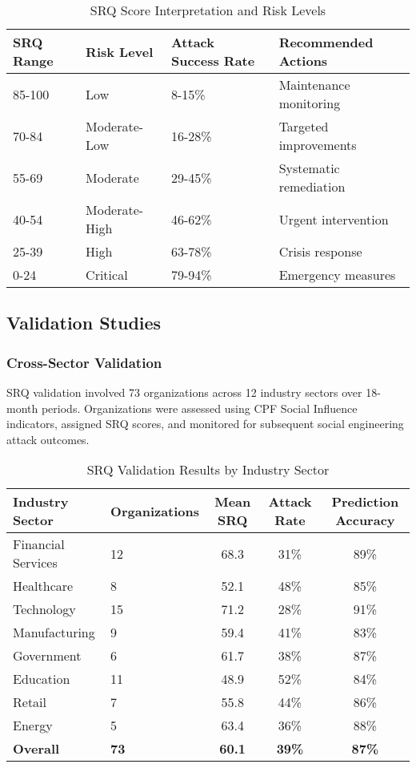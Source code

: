 \documentclass[11pt,a4paper]{article}
\begin{document}
\begin{table}[H]
\centering
\caption{SRQ Score Interpretation and Risk Levels}
\begin{tabular}{llll}
\toprule
SRQ Range & Risk Level & Attack Success Rate & Recommended Actions \\
\midrule
85-100 & Low & 8-15\% & Maintenance monitoring \\
70-84 & Moderate-Low & 16-28\% & Targeted improvements \\
55-69 & Moderate & 29-45\% & Systematic remediation \\
40-54 & Moderate-High & 46-62\% & Urgent intervention \\
25-39 & High & 63-78\% & Crisis response \\
0-24 & Critical & 79-94\% & Emergency measures \\
\bottomrule
\end{tabular}
\end{table}

\subsection{Validation Studies}

\subsubsection{Cross-Sector Validation}

SRQ validation involved 73 organizations across 12 industry sectors over 18-month periods. Organizations were assessed using CPF Social Influence indicators, assigned SRQ scores, and monitored for subsequent social engineering attack outcomes.

\begin{table}[H]
\centering
\caption{SRQ Validation Results by Industry Sector}
\begin{tabular}{llccc}
\toprule
Industry Sector & Organizations & Mean SRQ & Attack Rate & Prediction Accuracy \\
\midrule
Financial Services & 12 & 68.3 & 31\% & 89\% \\
Healthcare & 8 & 52.1 & 48\% & 85\% \\
Technology & 15 & 71.2 & 28\% & 91\% \\
Manufacturing & 9 & 59.4 & 41\% & 83\% \\
Government & 6 & 61.7 & 38\% & 87\% \\
Education & 11 & 48.9 & 52\% & 84\% \\
Retail & 7 & 55.8 & 44\% & 86\% \\
Energy & 5 & 63.4 & 36\% & 88\% \\
\midrule
\textbf{Overall} & \textbf{73} & \textbf{60.1} & \textbf{39\%} & \textbf{87\%} \\
\bottomrule
\end{tabular}
\end{table}
\end{document}
